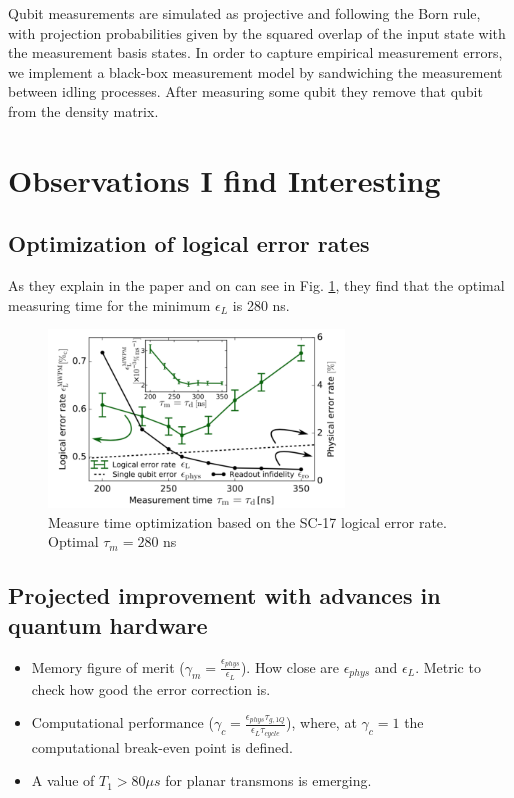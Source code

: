 \documentclass[11pt]{article}
\begin{document}
Qubit measurements are simulated as projective and following the Born rule, with projection probabilities given by the squared overlap of the input state with the measurement basis states. In order to capture empirical measurement errors, we implement a black-box measurement model by sandwiching the measurement between idling processes. After measuring some qubit they remove that qubit from the density matrix.


\section{Observations I find Interesting}
\label{sec:orga970709}
\subsection{Optimization of logical error rates}
\label{sec:org3ab3fc4}

As they explain in the paper and on can see in Fig. \ref{fig:org527106d}, they find that the optimal measuring time for the minimum \(\epsilon_L\) is 280 ns.

\begin{figure}[htbp]
\centering
\includegraphics[width=0.7\textwidth]{measure_t_optimization.png}
\caption{\label{fig:org527106d}
Measure time optimization based on the SC-17 logical error rate. Optimal \(\tau_m = 280\) ns}
\end{figure}


\subsection{Projected improvement with advances in quantum hardware}
\label{sec:org0912ead}

\begin{itemize}
\item Memory figure of merit (\(\gamma_m = \frac{\epsilon_{phys}}{\epsilon_{L}}\)). How close are \(\epsilon_{phys}\) and \(\epsilon_{L}\). Metric to check how good the error correction is.

\item Computational performance (\(\gamma_c = \frac{\epsilon_{phys} \tau_{g,1Q}}{\epsilon_L \tau_{cycle}}\)), where, at \(\gamma_c = 1\) the computational break-even point is defined.

\item A value of \(T_1 > 80 \mu s\) for planar transmons is emerging.
\end{itemize}
\end{document}

